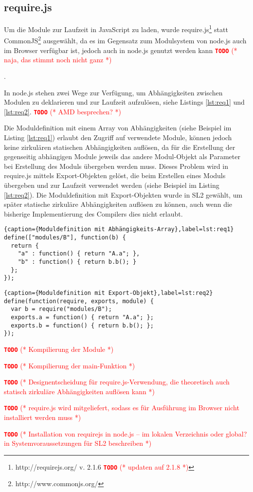 \documentclass[runningheads]{llncs}
\newcommand{\TODO}[1]{ \textcolor{red}{\textbf{\texttt{\large{TODO}}} (* #1 *)}\par}
\begin{document}
\subsection{require.js}
\label{sec:compReq}

Um die Module zur Laufzeit in JavaScript zu laden, wurde
require.js\footnote{http://requirejs.org/ v. 2.1.6 \TODO{updaten auf 2.1.8}}
statt CommonJS\footnote{http://www.commonjs.org/} ausgewählt, da es im
Gegensatz zum Modulsystem von node.js auch im Browser verfügbar ist,
jedoch auch in node.js genutzt werden kann\TODO{naja, das stimmt noch nicht ganz}.

In node.js stehen zwei Wege zur Verfügung, um Abhängigkeiten zwischen
Modulen zu deklarieren und zur Laufzeit aufzulösen, siehe Listings
\ref{lst:req1} und \ref{lst:req2}. \TODO{AMD besprechen?} Die
Moduldefinition mit einem Array von Abhängigkeiten (siehe Beispiel im
Listing \ref{lst:req1}) erlaubt den Zugriff auf verwendete Module,
können jedoch keine zirkulären statischen Abhängigkeiten auflösen, da
für die Erstellung der gegenseitig abhängigen Module jeweils das
andere Modul-Objekt als Parameter bei Erstellung des Moduls übergeben
werden muss. Dieses Problem wird in require.js mittels
Export-Objekten gelöst, die beim Erstellen eines Moduls übergeben und
zur Laufzeit verwendet werden (siehe Beispiel im Listing
\ref{lst:req2}). Die Moduldefinition mit Export-Objekten wurde in SL2
gewählt, um später statische zirkuläre Abhängigkeiten auflösen zu
können, auch wenn die bisherige Implementierung des Compilers dies
nicht erlaubt.

\begin{lstlisting}{caption={Moduldefinition mit Abhängigkeits-Array},label=lst:req1}
define(["modules/B"], function(b) {
  return {
    "a" : function() { return "A.a"; },
    "b" : function() { return b.b(); }
  };
});
\end{lstlisting}

\begin{lstlisting}{caption={Moduldefinition mit Export-Objekt},label=lst:req2}
define(function(require, exports, module) {
  var b = require("modules/B");
  exports.a = function() { return "A.a"; };
  exports.b = function() { return b.b(); };
});
\end{lstlisting}

\TODO{Kompilierung der Module}

\TODO{Kompilierung der main-Funktion}

\TODO{Designentscheidung für require.js-Verwendung, die theoretisch
auch statisch zirkuläre Abhängigkeiten auflösen kann}
\TODO{require.js wird mitgeliefert, sodass es für Ausführung im
Browser nicht installiert werden muss}
\TODO{Installation von requirejs in node.js -- im lokalen Verzeichnis
oder global? in Systemvoraussetzungen für SL2 beschreiben}
\end{document}
